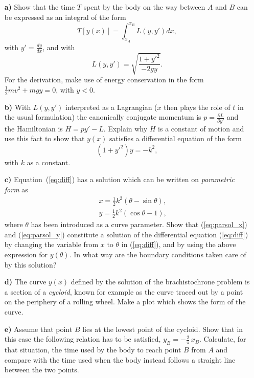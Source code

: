\documentclass[11pt,a4paper]{report}
\newcounter{excount}[chapter]
\newenvironment{exercise}[1][]{\addtocounter{excount}{1} \noindent {\bf Problem
    \arabic{excount} \ \ #1}\hspace{2mm}}{\vspace{4mm}}
\begin{document}
\begin{exercise}[Midterm Exam 2008]
\begin{itemize}
\item[\bf a)] Show that the time $T$  spent by the body on the way between $A$ and $B$ can be expressed as an integral of the form
\begin{equation}
T[y(x)]=\int_{x_A}^{x_B} L(y,y') dx,
\end{equation}
with $y'=\frac{dy}{dx}$, and with 
\begin{equation}
L(y,y')=\sqrt{\frac{1+y'^2}{-2gy}}.
\end{equation}
For the derivation, make use of energy conservation in the form $\frac{1}{2}m v^2+mgy=0$, with $y<0$.
\item[\bf b)] With $L(y,y')$ interpreted as a Lagrangian ($x$ then plays the role of $t$ in the usual formulation) the canonically conjugate momentum is $p=\frac{\partial L}{\partial y'}$ and the Hamiltonian is $H=py'-L$. Explain why $H$ is a constant of motion and use this fact to show that $y(x)$ satisfies a differential equation of the form
\begin{equation}
(1+y'^2)y=-k^2,
\label{eq:diff}
\end{equation}
with $k$ as a constant.
\item[\bf c)] Equation~(\ref{eq:diff}) has a solution which can be written on {\em parametric form} as
\begin{eqnarray}
&&x=\frac{1}{2} k^2(\theta-\sin\theta) \label{eq:parsol_x},\\
&&y=\frac{1}{2} k^2(\cos\theta-1) \label{eq:parsol_y},
\end{eqnarray}
where $\theta$ has been introduced as a curve parameter. Show that (\ref{eq:parsol_x}) and (\ref{eq:parsol_y}) constitute a solution of the differential equation (\ref{eq:diff}) by changing the variable from $x$ to $\theta$ in (\ref{eq:diff}), and by using the above expression for $y(\theta)$. In what way are the boundary conditions taken care of by this solution?
\item[\bf d)]  The curve $y(x)$ defined by the solution of the brachistochrone problem is a section of a {\em cycloid}, known for example as the curve traced out by a point on the periphery of a rolling wheel. Make a plot which shows the form of the curve. 
\item[\bf e)] Assume that point $B$ lies at the lowest point of the cycloid. Show that in this case the following relation has to be satisfied,  $y_B=-\frac{2}{\pi} \,x_B$. Calculate, for that situation, the time used by the body to reach point $B$ from $A$ and compare with the time used when the body instead follows a straight  line between the two points.
\end{itemize}
\end{exercise}
\end{document}
